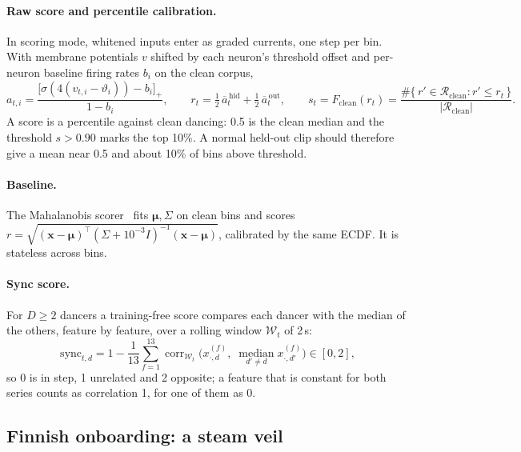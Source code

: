 \documentclass[10pt]{article}
\begin{document}
\paragraph{Raw score and percentile calibration.} In scoring mode, whitened inputs enter as graded currents, one step per bin. With membrane potentials $v$ shifted by each neuron's threshold offset and per-neuron baseline firing rates $b_i$ on the clean corpus,
\begin{equation}
  a_{t,i} = \frac{\big[\sigma(4(v_{t,i}-\vartheta_i)) - b_i\big]_+}{1-b_i}, \qquad
  r_t = \tfrac12\,\overline{a}^{\,\mathrm{hid}}_t + \tfrac12\,\overline{a}^{\,\mathrm{out}}_t,
  \qquad
  s_t = \hat F_{\mathrm{clean}}(r_t) = \frac{\#\{\,r' \in \mathcal{R}_{\mathrm{clean}} : r'\le r_t\,\}}{|\mathcal{R}_{\mathrm{clean}}|}.
  \label{eq:ecdf}
\end{equation}
A score is a percentile against clean dancing: 0.5 is the clean median and the threshold $s>0.90$ marks the top 10\%. A normal held-out clip should therefore give a mean near 0.5 and about 10\% of bins above threshold.

\paragraph{Baseline.} The Mahalanobis scorer~\cite{mahalanobis1936} fits $\bm\mu,\Sigma$ on clean bins and scores $r=\sqrt{(\mathbf{x}-\bm\mu)^{\!\top}(\Sigma+10^{-3}I)^{-1}(\mathbf{x}-\bm\mu)}$, calibrated by the same ECDF. It is stateless across bins.

\paragraph{Sync score.} For $D\ge2$ dancers a training-free score compares each dancer with the median of the others, feature by feature, over a rolling window $\mathcal{W}_t$ of 2\,s:
\begin{equation}
  \mathrm{sync}_{t,d} = 1 - \frac{1}{13}\sum_{f=1}^{13} \operatorname{corr}_{\mathcal{W}_t}\!\Big(x^{(f)}_{\cdot,d},\; \operatorname*{median}_{d'\neq d} x^{(f)}_{\cdot,d'}\Big) \in [0,2],
  \label{eq:sync}
\end{equation}
so 0 is in step, 1 unrelated and 2 opposite; a feature that is constant for both series counts as correlation 1, for one of them as 0.

\subsection{Finnish onboarding: a steam veil}
\label{sec:steam}
\end{document}
